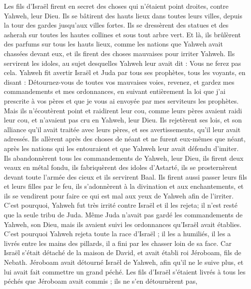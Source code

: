 \begin{multicols}{2}
Les fils d'Israël firent en secret des choses qui n'étaient point droites, contre Yahweh, leur Dieu. Ils se bâtirent des hauts lieux dans toutes leurs villes, depuis la tour des gardes jusqu'aux villes fortes.
Ils se dressèrent des statues et des asherah sur toutes les hautes collines et sous tout arbre vert.
Et là, ils brûlèrent des parfums sur tous les hauts lieux, comme les nations que Yahweh avait chassées devant eux, et ils firent des choses mauvaises pour irriter Yahweh.
Ils servirent les idoles, au sujet desquelles Yahweh leur avait dit : Vous ne ferez pas cela.
Yahweh fit avertir Israël et Juda par tous ses prophètes, tous les voyants, en disant : Détournez-vous de toutes vos mauvaises voies, revenez, et gardez mes commandements et mes ordonnances, en suivant entièrement la loi que j'ai prescrite à vos pères et que je vous ai envoyée par mes serviteurs les prophètes.
Mais ils n'écoutèrent point et raidirent leur cou, comme leurs pères avaient raidi leur cou, et n'avaient pas cru en Yahweh, leur Dieu.
Ils rejetèrent ses lois, et son alliance qu'il avait traitée avec leurs pères, et ses avertissements, qu'il leur avait adressés. Ils allèrent après des choses de néant et ne furent eux-mêmes que néant, après les nations qui les entouraient et que Yahweh leur avait défendu d'imiter.
Ils abandonnèrent tous les commandements de Yahweh, leur Dieu, ils firent deux veaux en métal fondu, ils fabriquèrent des idoles d'Astarté, ils se prosternèrent devant toute l'armée des cieux et ils servirent Baal.
Ils firent aussi passer leurs fils et leurs filles par le feu, ils s'adonnèrent à la divination et aux enchantements, et ils se vendirent pour faire ce qui est mal aux yeux de Yahweh afin de l'irriter.
C'est pourquoi, Yahweh fut très irrité contre Israël et il les rejeta; il n'est resté que la seule tribu de Juda.
Même Juda n'avait pas gardé les commandements de Yahweh, son Dieu, mais ils avaient suivi les ordonnances qu'Israël avait établies.
C'est pourquoi Yahweh rejeta toute la race d'Israël ; il les a humiliés, il les a livrés entre les mains des pillards, il a fini par les chasser loin de sa face.
Car Israël s'était détaché de la maison de David, et avait établi roi Jéroboam, fils de Nebath. Jéroboam avait détourné Israël de Yahweh, afin qu'il ne le suive plus, et lui avait fait commettre un grand péché.
Les fils d'Israël s'étaient livrés à tous les péchés que Jéroboam avait commis ; ils ne s'en détournèrent pas,

\end{multicols}
